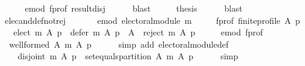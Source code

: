 \begin{isabellebody}
\ \ \ \ \isamarkupfalse%
\ e{\isacharunderscore}{\kern0pt}mod\ f{\isacharunderscore}{\kern0pt}prof\ result{\isacharunderscore}{\kern0pt}disj\isanewline
\ \ \ \ \isamarkupfalse%
\ blast\isanewline
\ \ \isamarkupfalse%
\ \isamarkupfalse%
\ {\isacharquery}{\kern0pt}thesis\isanewline
\ \ \ \ \isamarkupfalse%
\ blast\isanewline
{}\isamarkupfalse%
%
\endisatagproof
{\isafoldproof}%
%
\isadelimproof
\isanewline
%
\endisadelimproof
\isanewline
{}\isamarkupfalse%
\ elec{\isacharunderscore}{\kern0pt}and{\isacharunderscore}{\kern0pt}def{\isacharunderscore}{\kern0pt}not{\isacharunderscore}{\kern0pt}rej{\isacharcolon}{\kern0pt}\isanewline
\ \ \isanewline
\ \ \ \ e{\isacharunderscore}{\kern0pt}mod{\isacharcolon}{\kern0pt}\ {\isachardoublequoteopen}electoral{\isacharunderscore}{\kern0pt}module\ m{\isachardoublequoteclose}\ \isanewline
\ \ \ \ f{\isacharunderscore}{\kern0pt}prof{\isacharcolon}{\kern0pt}\ {\isachardoublequoteopen}finite{\isacharunderscore}{\kern0pt}profile\ A\ p{\isachardoublequoteclose}\isanewline
\ \ \ {\isachardoublequoteopen}elect\ m\ A\ p\ {\isasymunion}\ defer\ m\ A\ p\ {\isacharequal}{\kern0pt}\ A\ {\isacharminus}{\kern0pt}\ {\isacharparenleft}{\kern0pt}reject\ m\ A\ p{\isacharparenright}{\kern0pt}{\isachardoublequoteclose}\isanewline
%
\isadelimproof
%
\endisadelimproof
%
\isatagproof
{}\isamarkupfalse%
\ {\isacharminus}{\kern0pt}\isanewline
\ \ \isamarkupfalse%
\ e{\isacharunderscore}{\kern0pt}mod\ f{\isacharunderscore}{\kern0pt}prof\ \isamarkupfalse%
\ {}{\isacharcolon}{\kern0pt}\ {\isachardoublequoteopen}well{\isacharunderscore}{\kern0pt}formed\ A\ {\isacharparenleft}{\kern0pt}m\ A\ p{\isacharparenright}{\kern0pt}{\isachardoublequoteclose}\isanewline
\ \ \ \ \isamarkupfalse%
\ {\isacharparenleft}{\kern0pt}simp\ add{\isacharcolon}{\kern0pt}\ electoral{\isacharunderscore}{\kern0pt}module{\isacharunderscore}{\kern0pt}def{\isacharparenright}{\kern0pt}\isanewline
\ \ \isamarkupfalse%
\isanewline
\ \ \ \ {\isachardoublequoteopen}disjoint{}\ {\isacharparenleft}{\kern0pt}m\ A\ p{\isacharparenright}{\kern0pt}\ {\isasymand}\ set{\isacharunderscore}{\kern0pt}equals{\isacharunderscore}{\kern0pt}partition\ A\ {\isacharparenleft}{\kern0pt}m\ A\ p{\isacharparenright}{\kern0pt}{\isachardoublequoteclose}\isanewline
\ \ \ \ \isamarkupfalse%
\ simp\isanewline
\ \ \isamarkupfalse%

\end{isabellebody}
